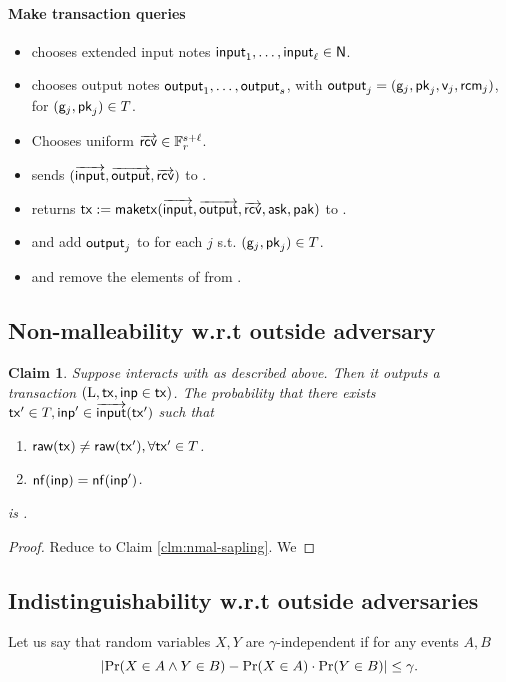 \documentclass[11pt]{article}
\numberwithin{equation}{section} %
\numberwithin{figure}{section} %
\newtheorem{claim}[thm]{Claim}
\newcommand{\inp}{\ensuremath{\mathsf{inp}}\xspace}
\newcommand{\out}{\ensuremath{\mathsf{out}}\xspace}
\begin{document}
\paragraph{Make transaction queries}
\begin{itemize}
\item \adv chooses extended input notes $\mathsf{input}_1,\ldots,\mathsf{input}_\ell\in\mathsf{N}$.
\item \adv chooses output notes $\mathsf{output}_1,\ldots,\mathsf{output}_s$, with $\mathsf{output}_j = (\mathsf{g}_j,\mathsf{pk}_j,\mathsf{v}_j,\mathsf{rcm}_j)$, for $(\mathsf{g}_j,\mathsf{pk}_j)\in T$.
\item \adv Chooses uniform $\overrightarrow{\mathsf{rcv}}\in {\mathbb F}_r^{s+\ell}$.
\item \adv sends $(\overrightarrow{\mathsf{input}},\overrightarrow{\mathsf{output}},\overrightarrow{\mathsf{rcv}})$ to \oracle.
\item \oracle returns $\mathsf{tx}:= \mathsf{maketx}(\overrightarrow{\mathsf{input}},\overrightarrow{\mathsf{output}},\overrightarrow{\mathsf{rcv}},\mathsf{ask},\mathsf{pak})$ to \adv.
\item \adv and \oracle add $\mathsf{output}_j$ to \curnotes for each $j$ s.t. $(\mathsf{g}_j,\mathsf{pk}_j)\in T$.
\item \adv and \oracle remove the elements of  from \curnotes.
\end{itemize}


 
\subsection{Non-malleability w.r.t outside adversary}
\begin{claim}\label{clm:nmal-sapling-outside}
 Suppose \adv interacts with \oracle as described above.
 Then it outputs a transaction $(\ledger,\tx,\inp\in\tx)$.
 The probability that there exists $\tx'\in T,\inp'\in \inputs(\tx')$ such that 
 \begin{enumerate}
  \item $\mathsf{raw(\mathsf{tx})}\neq \mathsf{raw(\mathsf{tx}')},\forall \mathsf{tx}'\in T$.
  \item $\nf(\inp)=\nf(\inp')$.
 \end{enumerate}
is \negl.
\end{claim}
\begin{proof}
Reduce to Claim \ref{clm:nmal-sapling}.
We
\end{proof}
\subsection{Indistinguishability w.r.t outside adversaries}
Let us say that random variables $X,Y$ are $\gamma$-independent if for
any events $A,B$
\[|\mathrm{Pr}(X\in A \wedge Y\in B)-\mathrm{Pr}(X\in A)\cdot \mathrm{Pr}(Y\in B)|\leq \gamma.\]
\end{document}
